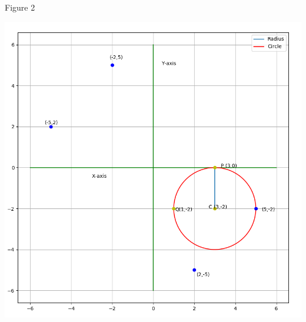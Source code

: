 \documentclass{beamer}
\begin{document}
\begin{frame}{Figure 2}
\begin{center}
\vspace{-0.75em}
\includegraphics[scale=0.39]{Fig_Circle2.png}
\end{center}
\end{frame}
\end{document}
